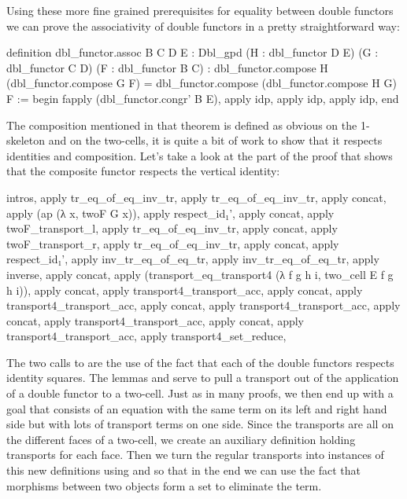 Using these more fine grained prerequisites for equality between double functors
we can prove the associativity of double functors in a pretty straightforward way:
\begin{leancodebr}
  definition dbl_functor.assoc {B C D E : Dbl_gpd}
    (H : dbl_functor D E) (G : dbl_functor C D) (F : dbl_functor B C) :
    dbl_functor.compose H (dbl_functor.compose G F)
    = dbl_functor.compose (dbl_functor.compose H G) F :=
  begin
    fapply (dbl_functor.congr' B E),
        apply idp,
      apply idp,
    apply idp,
  end
\end{leancodebr}

The composition mentioned in that theorem is defined as obvious on the 1-skeleton
and on the two-cells, it is quite a bit of work to show that it respects
identities and composition.
Let's take a look at the part of the proof that shows that the composite functor
respects the vertical identity:
\begin{leancodebr}
      intros, apply tr_eq_of_eq_inv_tr, apply tr_eq_of_eq_inv_tr,
      apply concat, apply (ap (λ x, twoF G x)), apply respect_id₁',
      apply concat, apply twoF_transport_l, apply tr_eq_of_eq_inv_tr,
      apply concat, apply twoF_transport_r, apply tr_eq_of_eq_inv_tr,
      apply concat, apply respect_id₁',
      apply inv_tr_eq_of_eq_tr, apply inv_tr_eq_of_eq_tr,
      apply inverse,
      apply concat, apply (transport_eq_transport4 (λ f g h i, two_cell E f g h i)),
      apply concat, apply transport4_transport_acc,
      apply concat, apply transport4_transport_acc,
      apply concat, apply transport4_transport_acc,
      apply concat, apply transport4_transport_acc,
      apply concat, apply transport4_transport_acc,
      apply transport4_set_reduce,
\end{leancodebr}
The two calls to  are the use of the fact that each of the
double functors respects identity squares.
The lemmas  and  serve to pull
a transport out of the application of a double functor to a two-cell.
Just as in many proofs, we then end up with a goal that consists of an equation
with the same term on its left and right hand side but with lots of transport
terms on one side.
Since the transports are all on the different faces of a two-cell, we create an
auxiliary definition  holding transports for each face.
Then we turn the regular transports into instances of this new definitions using
 and  so that in the
end we can use the fact that morphisms between two objects form a set to eliminate
the  term.

